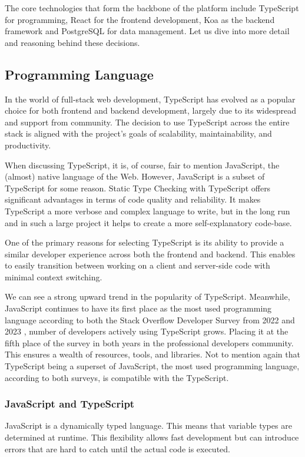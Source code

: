 The core technologies that form the backbone of the platform include TypeScript for programming, React for the frontend development, Koa as the backend framework and PostgreSQL for data management.
Let us dive into more detail and reasoning behind these decisions.

\subsection{Programming Language}
\label{subsec:programming-language}
In the world of full-stack web development, TypeScript has evolved as a popular choice for both frontend and backend development, largely due to its widespread and support from community.
The decision to use TypeScript across the entire stack is aligned with the project's goals of scalability, maintainability, and productivity.

When discussing TypeScript, it is, of course, fair to mention JavaScript, the (almost) native language of the Web.
However, JavaScript is a subset of TypeScript for some reason.
Static Type Checking with TypeScript offers significant advantages in terms of code quality and reliability.
It makes TypeScript a more verbose and complex language to write, but in the long run and in such a large project it helps to create a more self-explanatory code-base.

One of the primary reasons for selecting TypeScript is its ability to provide a similar developer experience across both the frontend and backend.
This enables to easily transition between working on a client and server-side code with minimal context switching.

We can see a strong upward trend in the popularity of TypeScript. Meanwhile, JavaScript continues to have its first place as the most used programming language according to both the Stack Overflow Developer Survey from 2022 \cite{StackOverflow2022} and 2023 \cite{StackOverflow2023}, number of developers actively using TypeScript grows. Placing it at the fifth place of the survey in both years in the professional developers community.
This ensures a wealth of resources, tools, and libraries.
Not to mention again that TypeScript being a superset of JavaScript, the most used programming language, according to both surveys, is compatible with the TypeScript.

\subsubsection{JavaScript and TypeScript}
JavaScript is a dynamically typed language.
This means that variable types are determined at runtime.
This flexibility allows fast development but can introduce errors that are hard to catch until the actual code is executed.

